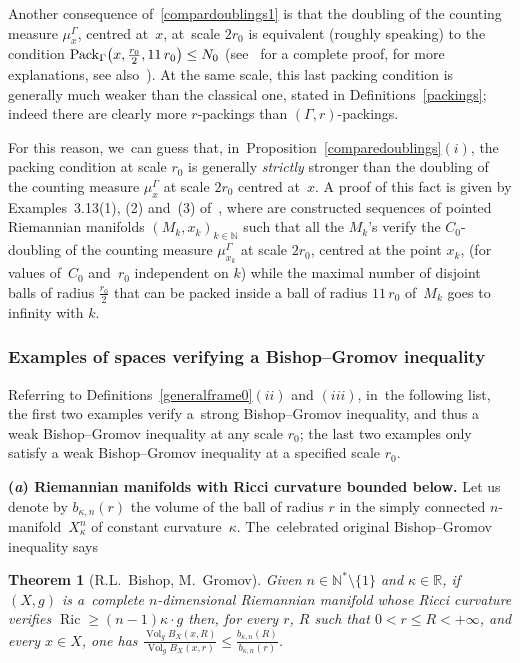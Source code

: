 \documentclass[10pt,a4paper]{amsart}
\numberwithin{equation}{section}
\newtheorem{theor}{Theorem}[section]
\newcommand{\N}{\mathbb{N}}
\newcommand{\R}{\mathbb{R}}
\newcommand{\Vol}{\operatorname{Vol}}
\newcommand{\Ric}{\operatorname{Ric}}
\begin{document}
Another consequence of~\eqref{compardoublings1} is that the doubling of the counting measure $\mu_{x}^{\Gamma} $, centred at~$x$, at~scale $2 r_0$
is equivalent (roughly speaking) to the condition ${\rm Pack}_\Gamma \big(x, \frac{r_0}{2}, 11\, r_0\big) \le N_0$ (see~\cite[Lemma~3.11]{BCGS} for a complete proof, for more explanations,
see also~\cite[Lemmas 3.14 and 3.15]{BCGS}). At the same scale, this last
packing condition is generally much weaker than the
classical one, stated in Definitions~\ref{packings}; indeed there are clearly more $r$-packings than $(\Gamma,r)$-packings.

For this reason, we~can guess that, in~Proposition~\ref{comparedoublings}$(i)$, the packing condition at scale $r_0$ is generally \textit{strictly} stronger than the doubling of the counting measure $\mu_{x}^{\Gamma}$ at scale $2 r_0$ centred at~$x$. A proof of this fact is given by Examples~3.13(1), (2) and~(3) of~\cite{BCGS}, where are constructed sequences of pointed Riemannian manifolds $(M_k, x_k)_{k \in \N}$ such that all the $M_k$'s verify the $C_0$-doubling of the counting measure $\mu_{x_k}^{\Gamma}$ at scale $2 r_0$, centred at the point $x_k$, (for values of~$C_0$ and~$r_0$ independent on $k$) while the maximal number of disjoint balls of
radius $ \frac{r_0}{2}$ that can be packed inside a ball of radius $11\, r_0$ of~$M_k$ goes to infinity with $k$.

\subsubsection{Examples of spaces verifying a Bishop--Gromov inequality}\label{BGexemples}

Referring to Definitions~\ref{generalframe0}$(ii)$ and $(iii)$, in~the following list, the first two examples verify a~strong Bishop--Gromov inequality,
and thus a weak Bishop--Gromov inequality at any scale $r_0$; the last two
examples only satisfy a weak Bishop--Gromov inequality at a specified scale $r_0$.

\medskip\noindent
{\bf (\emph{a}) Riemannian manifolds with Ricci curvature bounded below.}
Let us denote by $b_{\kappa, n} (r)$ the volume of the ball of radius $r$ in the simply connected $n$-manifold~$X_{\kappa}^n$ of constant curvature~$\kappa$. The~celebrated original Bishop--Gromov inequality says

\begin{theor}[R.L.~Bishop, M.~Gromov]\label{BishopGromov}
Given $n \in \N^* \setminus \{1\}$ and $\kappa \in \R$, if $(X,g)$ is a~complete $n$-dimensional Riemannian manifold whose Ricci curvature verifies $\Ric \ge (n-1) \kappa \cdot g $ then, for every $r$, $R$ such
that $0 < r \le R < +\infty$, and every $x \in X$, one has $\frac{\Vol_g
 B_X(x, R)}{\Vol_g B_X(x, r)} \le \frac{b_{\kappa, n} (R)}{b_{\kappa, n} ( r)}$.
\end{theor}
\end{document}
